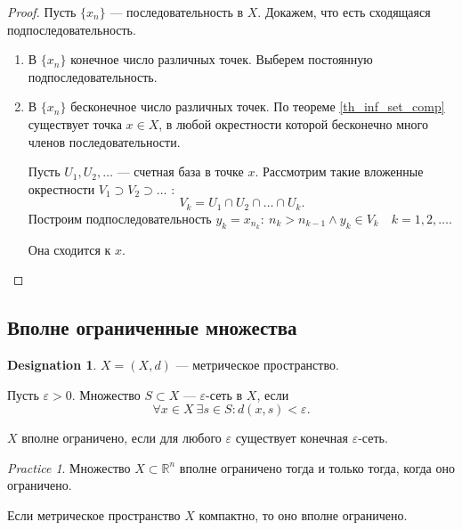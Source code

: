\documentclass[11pt]{book}
\newcommand{\R}{\mathbb{R}}
\theoremstyle{definition}
\theoremstyle{plain}
\theoremstyle{plain}
\theoremstyle{definition}
\newtheorem*{name}{Designation}
\theoremstyle{remark}
\newtheorem*{prac}{Practice}
\begin{document}
\begin{proof}
    Пусть $ \{x_{n}\}$ --- последовательность в $ X$. Докажем, что есть сходящаяся подпоследовательность.
    \begin{enumerate}
	\item В $ \{x_n\}$ конечное число различных точек. Выберем постоянную подпоследовательность.
	\item В $ \{x_{n}\}$ бесконечное число различных точек. По теореме \ref{th_inf_set_comp} существует точка $ x \in X$, в любой окрестности которой бесконечно много членов последовательности.

	    Пусть $ U_1, U_2, \ldots $ --- счетная база в точке $ x$. Рассмотрим такие вложенные окрестности
	    $ V_1 \supset V_2 \supset \ldots $ :
	    \[
		V_k = U_1 \cap U_2 \cap  \ldots \cap U_k
	    .\]
	    Построим подпоследовательность $ y_k = x_{n_k}: ~ n_k > n_{k-1} \wedge y_k \in V_k \quad k = 1, 2, \ldots $.

	    Она сходится к $ x$.
    \end{enumerate}
\end{proof}
\subsection{Вполне ограниченные множества}
\begin{name}
    $ X = (X, d)$ --- метрическое пространство.
\end{name}
\begin{defn}
    Пусть $ \varepsilon >0$. Множество $ S \subset X$ --- $ \varepsilon $-сеть в $ X$, если
    \[
	\forall x \in X~ \exists s \in S: d(x, s)< \varepsilon
    .\]
\end{defn}
\begin{defn}
    $ X$ вполне ограничено, если для любого  $ \varepsilon $ существует конечная $ \varepsilon $-сеть.
\end{defn}
\begin{prac}
    Множество $ X \subset \R^{n} $ вполне ограничено тогда и только тогда, когда оно ограничено.
\end{prac}
\begin{thm}\label{th_comp_to_vpolne_ogran}
    Если метрическое пространство  $ X$ компактно, то оно вполне ограничено.
\end{thm}
\end{document}
